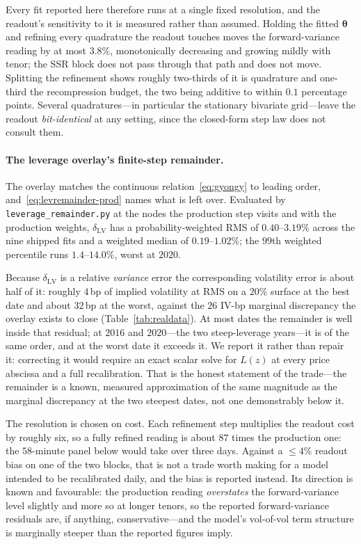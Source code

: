 \documentclass[11pt]{article}
\providecommand{\1}{\mathbf 1}
\newcommand{\bth}{{\boldsymbol{\theta}}}
\begin{document}
Every fit reported here therefore runs at a single fixed resolution, and the readout's sensitivity to
it is measured rather than assumed. Holding the fitted $\bth$ and refining every quadrature the
readout touches moves the forward-variance reading by at most $3.8\%$, monotonically decreasing and
growing mildly with tenor; the SSR block does not pass through that path and does not move. Splitting
the refinement shows roughly two-thirds of it is quadrature and one-third the recompression budget,
the two being additive to within $0.1$ percentage points. Several quadratures---in particular the
stationary bivariate grid---leave the readout \emph{bit-identical} at any setting, since the
closed-form step law does not consult them.

\paragraph{The leverage overlay's finite-step remainder.} The overlay matches the continuous
relation~\eqref{eq:gyongy} to leading order, and~\eqref{eq:levremainder-prod} names what is left
over. Evaluated by
\texttt{leverage\_remainder.py} at the nodes the production step visits and with the production
weights, $\delta_{\mathrm{LV}}$ has a probability-weighted RMS of $0.40$--$3.19\%$ across
the nine shipped fits and a weighted median of $0.19$--$1.02\%$; the $99$th weighted percentile runs
$1.4$--$14.0\%$, worst at $2020$.

Because $\delta_{\mathrm{LV}}$ is a relative \emph{variance} error the corresponding volatility error
is about half of it: roughly $4$\,bp of implied volatility at RMS on a $20\%$ surface at the best
date and about $32$\,bp at the worst, against the $26$ IV-bp marginal discrepancy the overlay exists
to close (Table~\ref{tab:realdata}). At most dates the remainder is well inside that residual; at
$2016$ and $2020$---the two steep-leverage years---it is of the same order, and at the worst date it
exceeds it. We report it rather than repair it: correcting it would require an exact scalar solve for
$L(z)$ at every price abscissa and a full recalibration. That is the honest statement of the
trade---the remainder is a known, measured approximation of the same magnitude as the marginal
discrepancy at the two steepest dates, not one demonstrably below it.

The resolution is chosen on cost. Each refinement step multiplies the readout cost by roughly six,
so a fully refined reading is about $87$ times the production one: the $58$-minute panel below
would take over three days. Against a ${\le}4\%$ readout bias on one of
the two blocks, that is not a trade worth making for a model intended to be recalibrated daily, and
the bias is reported instead. Its direction is known and favourable: the production reading
\emph{overstates} the forward-variance level slightly and more so at longer tenors, so the
reported forward-variance residuals are, if anything, conservative---and the model's vol-of-vol term
structure is marginally steeper than the reported figures imply.
\end{document}
